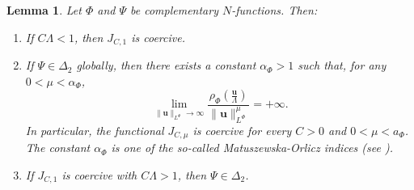 \documentclass[twoside]{article}
\newtheorem{lem}[thm]{Lemma}
\theoremstyle{remark}
\newcommand{\orlnor}{\|_{L^{\Phi}}}
\renewcommand{\b}[1]{\boldsymbol{#1}}
\begin{document}
\begin{lem}\label{lem_coer} Let $\Phi$ and $\Psi$ be complementary $N$-functions. Then:
\begin{enumerate}
  \item If $C\Lambda<1$, then $J_{C,1}$ is coercive. 
  
  \item If $\Psi \in \Delta_2$ globally, then there exists a constant $\alpha_{\Phi}>1$ such that, for any $0<\mu<\alpha_{\Phi}$,
\begin{equation}\label{coer_modular} \lim\limits_{\|\b{u}\orlnor \to \infty} \frac{\rho_{\Phi}\left(\frac{\b{u}}{\Lambda}\right)}{\|\b{u}\orlnor^{\mu}}=+\infty.
\end{equation}
In particular, the functional $J_{C,\mu}$ is coercive for every $C>0$ and  $0<\mu<a_{\Phi}$. The constant $\alpha_{\Phi}$ is one of the so-called \emph{ Matuszewska-Orlicz indices} (see \cite[Ch. 11]{M}).
\item If $J_{C,1}$ is coercive with $C\Lambda>1$, then $\Psi \in \Delta_2$.  
\end{enumerate}
\end{lem}
\end{document}

